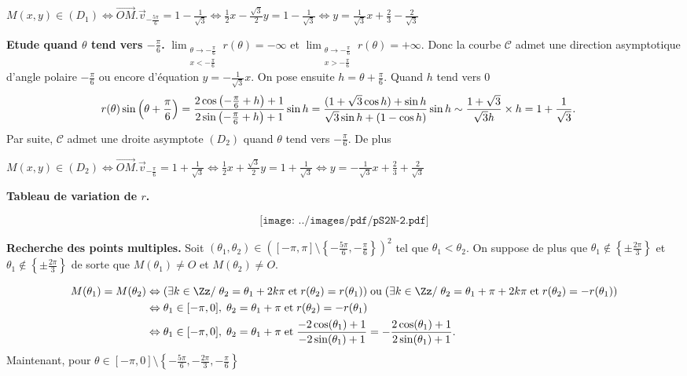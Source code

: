 {{\begin{center}
$M(x,y)\in(D_1)\Leftrightarrow \overrightarrow{OM}.\overrightarrow{v}_{-\frac{5\pi}{6}}=1-\frac{1}{\sqrt{3}}\Leftrightarrow\frac{1}{2}x-\frac{\sqrt{3}}{2}y=1-\frac{1}{\sqrt{3}}\Leftrightarrow y=\frac{1}{\sqrt{3}}x+\frac{2}{3}-\frac{2}{\sqrt{3}}$
\end{center}
\textbf{Etude quand $\theta$ tend vers $-\frac{\pi}{6}$.} $\displaystyle\lim_{\substack{\theta\rightarrow-\frac{\pi}{6}\\ x<-\frac{\pi}{6}}}r(\theta)=-\infty$ et $\displaystyle\lim_{\substack{\theta\rightarrow-\frac{\pi}{6}\\ x>-\frac{\pi}{6}}}r(\theta)=+\infty$. Donc la courbe $\mathcal{C}$ admet une direction asymptotique d'angle polaire $-\frac{\pi}{6}$ ou encore d'équation $y=-\frac{1}{\sqrt{3}}x$.
On pose ensuite $h=\theta+\frac{\pi}{6}$. Quand $h$ tend vers $0$
\begin{align*}\ensuremath
r(\theta)\sin\left(\theta+\frac{\pi}{6}\right)&=\frac{2\cos\left(-\frac{\pi}{6}+h\right)+1}{2\sin\left(-\frac{\pi}{6}+h\right)+1}\sin h=\frac{(1+\sqrt{3}\cos h)+\sin h}{\sqrt{3}\sin h+(1-\cos h)}\sin h\sim\frac{1+\sqrt{3}}{\sqrt{3}h}\times h=1+\frac{1}{\sqrt{3}}.
\end{align*}
Par suite, $\mathcal{C}$ admet une droite asymptote $(D_2)$ quand $\theta$ tend vers $-\frac{\pi}{6}$. De plus

\begin{center}
$M(x,y)\in(D_2)\Leftrightarrow \overrightarrow{OM}.\overrightarrow{v}_{-\frac{\pi}{6}}=1+\frac{1}{\sqrt{3}}\Leftrightarrow\frac{1}{2}x+\frac{\sqrt{3}}{2}y=1+\frac{1}{\sqrt{3}}\Leftrightarrow y=-\frac{1}{\sqrt{3}}x+\frac{2}{3}+\frac{2}{\sqrt{3}}$
\end{center}

\textbf{Tableau de variation de $r$.}


$$\texttt{[image: ../images/pdf/pS2N-2.pdf]}$$


\textbf{Recherche des points multiples.} Soit $(\theta_1,\theta_2)\in\left([-\pi,\pi]\setminus\left\{-\frac{5\pi}{6},-\frac{\pi}{6}\right\}\right)^2$ tel que $\theta_1<\theta_2$. On suppose de plus que $\theta_1\notin\left\{\pm\frac{2\pi}{3}\right\}$ et $\theta_1\notin\left\{\pm\frac{2\pi}{3}\right\}$ de sorte que $M(\theta_1)\neq O$ et $M(\theta_2)\neq O$. 

\begin{align*}\ensuremath
M(\theta_1)=M(\theta_2)&\Leftrightarrow(\exists k\in\Zz/\;\theta_2=\theta_1+2k\pi\;\text{et}\;r(\theta_2)=r(\theta_1))\;\text{ou}\;(\exists k\in\Zz/\;\theta_2=\theta_1+\pi+2k\pi\;\text{et}\;r(\theta_2)=-r(\theta_1))\\
 &\Leftrightarrow\theta_1\in[-\pi,0],\;\theta_2=\theta_1+\pi\;\text{et}\;r(\theta_2)=-r(\theta_1)\\
 &\Leftrightarrow\theta_1\in[-\pi,0],\;\theta_2=\theta_1+\pi\;\text{et}\;\frac{-2\cos(\theta_1)+1}{-2\sin(\theta_1)+1}=-\frac{2\cos(\theta_1)+1}{2\sin(\theta_1)+1}.
\end{align*}
Maintenant, pour $\theta\in[-\pi,0]\setminus\left\{-\frac{5\pi}{6},-\frac{2\pi}{3},-\frac{\pi}{6}\right\}$

}}
